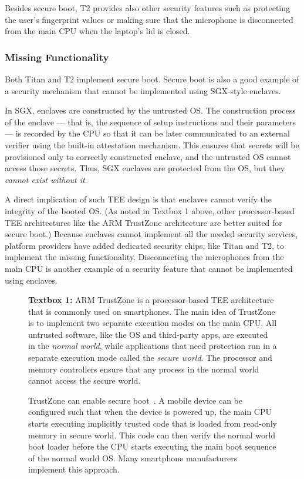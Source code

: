Besides secure boot, T2 provides also other security features such as protecting the user's fingerprint values or making sure that the microphone is disconnected from the main CPU when the laptop's lid is closed. 
 
 
\subsubsection*{Missing Functionality}
  
Both Titan and T2 implement secure boot. Secure boot is also a good example of a security mechanism that cannot be implemented using SGX-style enclaves. 

In SGX, enclaves are constructed by the untrusted OS. The construction process of the enclave --- that is, the sequence of setup instructions and their parameters --- is recorded by the CPU so that it can be later communicated to an external verifier using the built-in attestation mechanism. This ensures that secrets will be provisioned only to correctly constructed enclave, and the untrusted OS cannot access those secrets. Thus, SGX enclaves are protected from the OS, but they \emph{cannot exist without it}. 

A direct implication of such TEE design is that enclaves cannot verify the integrity of the booted OS. (As noted in Textbox 1 above, other processor-based TEE architectures like the ARM TrustZone architecture are better suited for secure boot.) Because enclaves cannot implement all the needed security services, platform providers have added dedicated security chips, like Titan and T2, to implement the missing functionality. Disconnecting the microphones from the main CPU is another example of a security feature that cannot be implemented using enclaves.


\begin{figure}
    \begin{tcolorbox}
    \textbf{Textbox 1:} 
    ARM TrustZone is a processor-based TEE architecture that is commonly used on smartphones. The main idea of TrustZone is to implement two separate execution modes on the main CPU. All untrusted software, like the OS and third-party apps, are executed in the \emph{normal world}, while applications that need protection run in a separate execution mode called the \emph{secure world}. The processor and memory controllers ensure that any process in the normal world cannot access the secure world.
    
    \hspace{10pt} TrustZone can enable secure boot~\cite{ekberg2014untapped}. A mobile device can be configured such that when the device is powered up, the main CPU starts executing implicitly trusted code that is loaded from read-only memory in secure world. This code can then verify the normal world boot loader before the CPU starts executing the main boot sequence of the normal world OS. Many smartphone manufacturers implement this approach.
	\end{tcolorbox}
\end{figure}  

